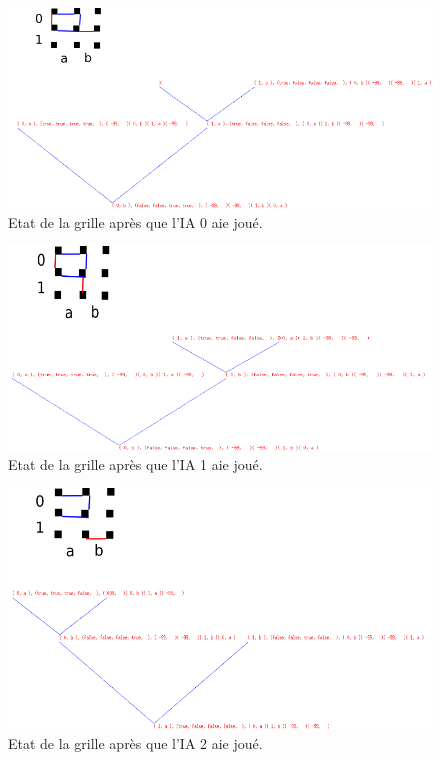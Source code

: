\documentclass[a4paper,12pt]{report}
\begin{document}
\begin{figure}[p]
	\includegraphics[width=15cm]{images/grid_state_play_ia0.png}
	\caption{\label{ia0plays}Etat de la grille apr\`es que l'IA 0 aie jou\'e.}
\end{figure}

\begin{figure}[p]
	\includegraphics[width=15cm]{images/grid_state_play_ia1.png}
	\caption{\label{ia1plays}Etat de la grille apr\`es que l'IA 1 aie jou\'e.}
\end{figure}

\begin{figure}[p]
	\includegraphics[width=15cm]{images/grid_state_play_ia2.png}
	\caption{\label{ia2plays}Etat de la grille apr\`es que l'IA 2 aie jou\'e.}
\end{figure}
\end{document}
